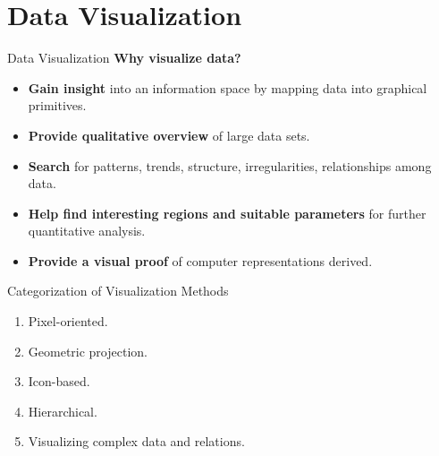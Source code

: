 \section{Data Visualization}

\begin{frame}{Data Visualization}
	\textbf{Why visualize data?}
	\begin{itemize}
		\item \textbf{Gain insight} into an information space by mapping data into graphical primitives.
		\item \textbf{Provide qualitative overview} of large data sets.
		\item \textbf{Search} for patterns, trends, structure, irregularities, relationships among data.
		\item \textbf{Help find interesting regions and suitable parameters} for further quantitative analysis.
		\item \textbf{Provide a visual proof} of computer representations derived.
	\end{itemize}
\end{frame}

\begin{frame}{Categorization of Visualization Methods}
	\begin{enumerate}
		\item Pixel-oriented.
		\item Geometric projection.
		\item Icon-based.
		\item Hierarchical.
		\item Visualizing complex data and relations.
	\end{enumerate}
\end{frame}

